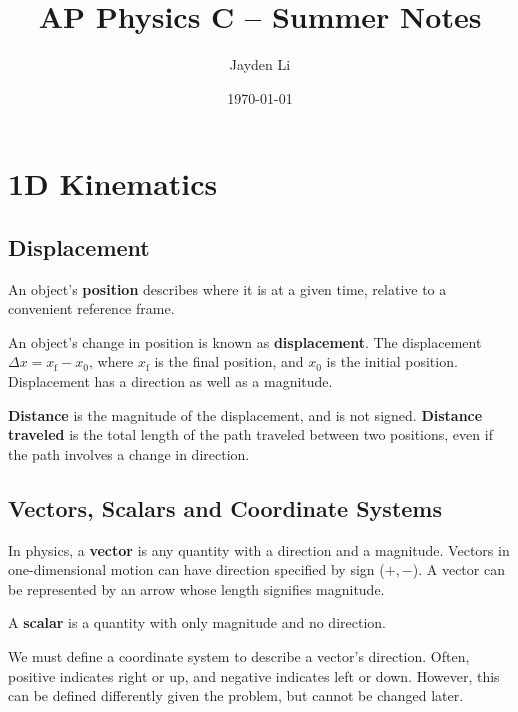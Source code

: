 \documentclass{article}
\title{\vspace*{-40pt}AP Physics C -- Summer Notes}
\author{Jayden Li}
\date{\today}
\newcommand{\definition}[1]{\begin{tcolorbox}[colback=red!5!white,colframe=red!75!black,parbox=false] #1 \end{tcolorbox}}
\begin{document}
\fontsize{11pt}{12pt}\selectfont
\setlength{\abovedisplayskip}{\abovedisplayskip/2}
\setlength{\belowdisplayskip}{\belowdisplayskip/2}
\setlength{\parindent}{0pt}
\setlength{\parskip}{2ex plus 0.5ex minus 0.2ex}
\maketitle

\tableofcontents

\section{1D Kinematics}

\subsection{Displacement}

\definition{An object's \textbf{position} describes where it is at a given time, relative to a convenient reference frame.}

\definition{An object's change in position is known as \textbf{displacement}. The displacement $\Delta x=x_\text{f}-x_0$, where $x_\text{f}$ is the final position, and $x_0$ is the initial position. Displacement has a direction as well as a magnitude.}

\definition{\textbf{Distance} is the magnitude of the displacement, and is not signed. \textbf{Distance traveled} is the total length of the path traveled between two positions, even if the path involves a change in direction.}

\subsection{Vectors, Scalars and Coordinate Systems}

\definition{In physics, a \textbf{vector} is any quantity with a direction and a magnitude. Vectors in one-dimensional motion can have direction specified by sign ($+,-$). A vector can be represented by an arrow whose length signifies magnitude.}

\definition{A \textbf{scalar} is a quantity with only magnitude and no direction.}

We must define a coordinate system to describe a vector's direction. Often, positive indicates right or up, and negative indicates left or down. However, this can be defined differently given the problem, but cannot be changed later.
\end{document}
